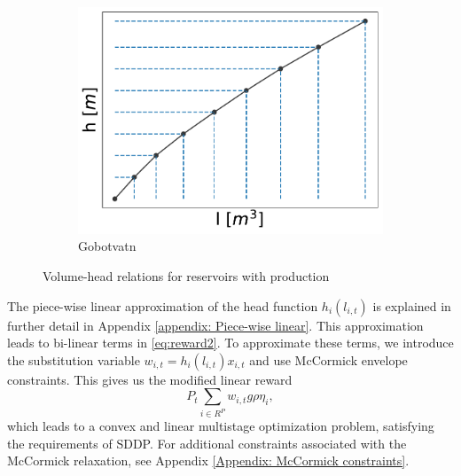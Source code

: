 \begin{figure}[h]
\begin{subfigure}[b]{0.25\textwidth}
         \centering
         \includegraphics[width=\textwidth]{head_res_relation_Gobotvatn1.pdf}
         \caption{Gobotvatn}
         \label{fig:head_res_relation_Gobotvatn}
     \end{subfigure}
        \caption{Volume-head relations for reservoirs with production}
        \label{fig:head_res_relations_Matre_H}
\end{figure}



The piece-wise linear approximation of the head function $h_{i}(l_{i,t})$ is explained in further detail in Appendix \ref{appendix: Piece-wise linear}. This approximation leads to bi-linear terms in \eqref{eq:reward2}. To approximate these terms, we introduce the substitution variable $w_{i,t}=h_{i}(l_{i,t})x_{i,t}$ and use McCormick envelope constraints. This gives us the modified linear reward
\begin{equation}
    P_{t}\sum_{i\in R^P} w_{i,t}g\rho\eta_i,
    \label{eq:reward3}
\end{equation}
which leads to a convex and linear multistage optimization problem, satisfying the requirements of SDDP. For additional constraints associated with the McCormick relaxation, see Appendix \ref{Appendix: McCormick constraints}.

